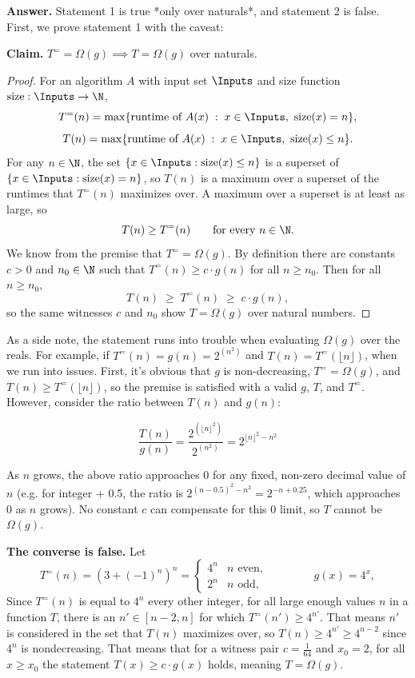 \documentclass[11pt]{article}
\begin{document}
\begin{enumerate}
\begin{enumerate}
\begin{enumerate}
    \vspace{0.5em}
    \noindent\textbf{Answer.} Statement 1 is true *only over naturals*, and statement 2 is false. First, we prove statement 1 with the caveat:
    
    \smallskip
    \noindent\textbf{Claim.} $T^{=}=\Omega(g) \implies T=\Omega(g)$ over naturals.

    \begin{proof}
    	For an algorithm $A$ with input set $\Inputs$ and size function $\mathrm{size}:\Inputs\rightarrow \N$,
    	\[
    	T^{=}(n)=\max\{\text{runtime of } A(x) \;:\; x\in \Inputs,\ \mathrm{size}(x)=n\},
    	\]
    	\[
    	T(n)=\max\{\text{runtime of } A(x) \;:\; x\in \Inputs,\ \mathrm{size}(x)\leq n\}.
    	\]
    For any $n\in\N$, the set $\{x\in \Inputs : \mathrm{size}(x)\leq n\}$ is a superset of $\{x\in \Inputs : \mathrm{size}(x)= n\}$, so $T(n)$ is a maximum over a superset of the runtimes that $T^{=}(n)$ maximizes over. A maximum over a superset is at least as large, so
    \[
      T(n)\geq T^{=}(n) \qquad \text{for every } n\in\N.
    \]
    We know from the premise that $T^{=}=\Omega(g)$. By definition there are constants $c>0$ and $n_0\in\N$ such that $T^{=}(n)\geq c\cdot g(n)$ for all $n\geq n_0$. Then for all $n\geq n_0$,
    \[
      T(n)\;\geq\; T^{=}(n)\;\geq\; c\cdot g(n),
    \]
    so the same witnesses $c$ and $n_0$ show $T=\Omega(g)$ over natural numbers.
    \end{proof}
    
    As a side note, the statement runs into trouble when evaluating $\Omega(g)$ over the reals. For example, if $T^=(n)=g(n)=2^{(n^2)}$ and $T(n)=T^=(\lfloor n \rfloor)$, when we run into issues. First, it's obvious that $g$ is non-decreasing, $T^==\Omega(g)$, and $T(n)\geq T^=(\lfloor n\rfloor)$, so the premise is satisfied with a valid $g$, $T$, and $T^=$. However, consider the ratio between $T(n)$ and $g(n)$:
    
    $$\frac{T(n)}{g(n)}=\frac{2^{(\lfloor n\rfloor^2)}}{2^{(n^2)}}=2^{\lfloor n\rfloor^2 - n^2}$$
    
    As $n$ grows, the above ratio approaches 0 for any fixed, non-zero decimal value of $n$ (e.g. for integer + 0.5, the ratio is $2^{(n-0.5)^2-n^2}=2^{-n+0.25}$, which approaches 0 as $n$ grows). No constant $c$ can compensate for this 0 limit, so $T$ cannot be $\Omega(g)$.

    \smallskip
    \noindent\textbf{The converse is false.} Let
    \[
      T^{=}(n)=\left(3+(-1)^n\right)^n=\begin{cases} 4^n & n \text{ even},\\ 2^n & n \text{ odd},\end{cases}
      \qquad\qquad g(x)=4^x,
    \]
    Since $T^=(n)$ is equal to $4^n$ every other integer, for all large enough values $n$ in a function $T$, there is an $n'\in[n-2, n]$ for which $T^=(n')\geq 4^{n'}$. That means $n'$ is considered in the set that $T(n)$ maximizes over, so $T(n)\geq 4^{n'}\geq 4^{n-2}$ since $4^n$ is nondecreasing. That means that for a witness pair $c=\frac{1}{64}$ and $x_0=2$, for all $x\geq x_0$ the statement $T(x)\geq c \cdot g(x)$ holds, meaning $T=\Omega(g)$.
    

\end{enumerate}
\end{enumerate}
\end{enumerate}
\end{document}
